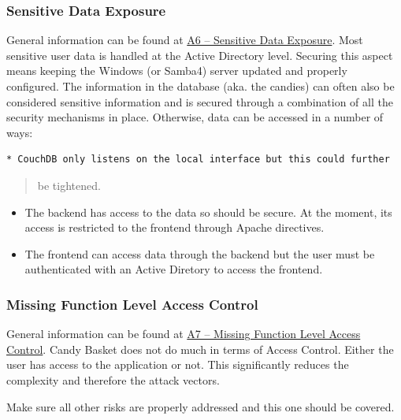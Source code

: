 \documentclass[letterpaper,10pt,english]{sphinxmanual}
\begin{document}
\subsubsection{Sensitive Data Exposure}
\label{developer-guide:sensitive-data-exposure}
General information can be found at \href{https://owasp.org/index.php/Top\_10\_2013-A6-Sensitive\_Data\_Exposure}{A6 -- Sensitive Data Exposure}. Most
sensitive user data is handled at the Active Directory level. Securing
this aspect means keeping the Windows (or Samba4) server updated and
properly configured. The information in the database (aka. the
candies) can often also be considered sensitive information and is
secured through a combination of all the security mechanisms in
place. Otherwise, data can be accessed in a number of ways:

\begin{Verbatim}[commandchars=\\\{\}]
* CouchDB only listens on the local interface but this could further
\end{Verbatim}
\begin{quote}

be tightened.
\end{quote}
\begin{itemize}
\item {} 
The backend has access to the data so should be secure. At the
moment, its access is restricted to the frontend through Apache directives.

\item {} 
The frontend can access data through the backend but the user must
be authenticated with an Active Diretory to access the frontend.

\end{itemize}


\subsubsection{Missing Function Level Access Control}
\label{developer-guide:missing-function-level-access-control}
General information can be found at \href{https://owasp.org/index.php/Top\_10\_2013-A7-Missing\_Function\_Level\_Access\_Control}{A7 -- Missing Function Level
Access Control}. Candy
Basket does not do much in terms of Access Control. Either the user
has access to the application or not. This significantly reduces the
complexity and therefore the attack vectors.

Make sure all other risks are properly addressed and this one should
be covered.
\end{document}
